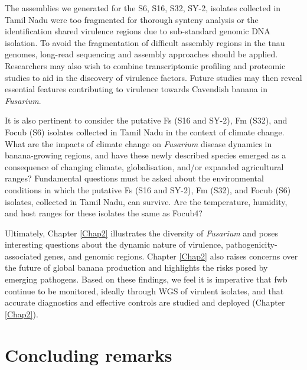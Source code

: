 The assemblies we generated for the S6, S16, S32, SY-2,  isolates collected in Tamil Nadu were too fragmented for thorough synteny analysis or the identification shared virulence regions due to sub-standard genomic DNA isolation. To avoid the fragmentation of difficult assembly regions in the \ac{tnau} genomes, long-read sequencing and assembly approaches should be applied. Researchers may also wish to combine transcriptomic profiling and proteomic studies to aid in the discovery of virulence factors. Future studies may then reveal essential features contributing to virulence towards Cavendish banana in \textit{Fusarium}. 

It is also pertinent to consider the putative \ac{Fs} (S16 and SY-2), \ac{Fm} (S32), and \ac{Focub} (S6) isolates collected in Tamil Nadu in the context of climate change. What are the impacts of climate change on \textit{Fusarium} disease dynamics in banana-growing regions, and have these newly described species emerged as a consequence of changing climate, globalisation, and/or expanded agricultural ranges? Fundamental questions must be asked about the environmental conditions in which the putative \ac{Fs} (S16 and SY-2), \ac{Fm} (S32), and \ac{Focub} (S6) isolates, collected in Tamil Nadu, can survive. Are the temperature, humidity, and host ranges for these isolates the same as \ac{Focub4}? 

Ultimately, Chapter \ref{Chap2} illustrates the diversity of \textit{Fusarium} and poses interesting questions about the dynamic nature of virulence, pathogenicity-associated genes, and genomic regions. Chapter \ref{Chap2} also raises concerns over the future of global banana production and highlights the risks posed by emerging pathogens. Based on these findings, we feel it is imperative that \ac{fwb} continue to be monitored, ideally through WGS of virulent isolates, and that accurate diagnostics and effective controls are studied and deployed (Chapter \ref{Chap2}).

\section{Concluding remarks} 

